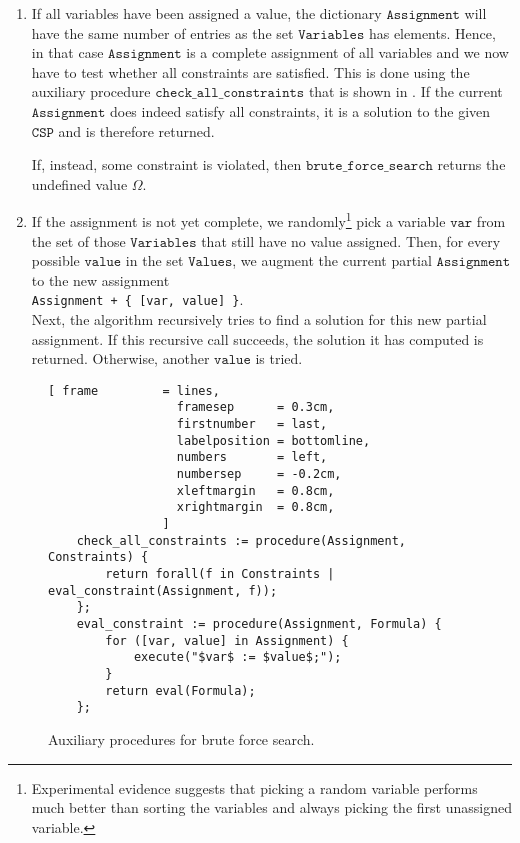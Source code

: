 \begin{enumerate}
\item If all variables have been assigned a value, the dictionary $\texttt{Assignment}$ will have the same
      number of entries as the set $\texttt{Variables}$ has elements.  Hence, in that case
      $\texttt{Assignment}$ is a complete assignment of all variables and we now have to test whether
      all constraints are satisfied.  This is done using the auxiliary procedure
      $\texttt{check\_all\_constraints}$ that is shown in . 
      If the current $\texttt{Assignment}$ does indeed satisfy all constraints, it is a solution to the given
      $\texttt{CSP}$ and is therefore returned.

      If, instead, some constraint is violated, then $\texttt{brute\_force\_search}$ returns the undefined value $\Omega$.
\item If the assignment is not yet complete, we randomly\footnote{
         Experimental evidence suggests that picking a random variable performs much better than sorting the
         variables and always picking the first unassigned variable.
      } 
      pick a variable $\texttt{var}$ from the set of those $\texttt{Variables}$ that still have no value assigned.  
      Then, for every possible
      $\texttt{value}$ in the set $\texttt{Values}$, we augment the current partial
      $\texttt{Assignment}$ to the new assignment
      \\[0.2cm]
      \hspace*{1.3cm}
      \texttt{Assignment + \{ [var, value] \}}.
      \\[0.2cm]
      Next, the algorithm recursively tries to find a solution for this new partial assignment.
      If this recursive call succeeds, the solution it has computed is returned.  Otherwise, another
      $\texttt{value}$ is tried.
\end{enumerate}


\begin{figure}[!ht]
\centering
\begin{Verbatim}[ frame         = lines, 
                  framesep      = 0.3cm, 
                  firstnumber   = last,
                  labelposition = bottomline,
                  numbers       = left,
                  numbersep     = -0.2cm,
                  xleftmargin   = 0.8cm,
                  xrightmargin  = 0.8cm,
                ]
    check_all_constraints := procedure(Assignment, Constraints) {
        return forall(f in Constraints | eval_constraint(Assignment, f));
    };       
    eval_constraint := procedure(Assignment, Formula) {
        for ([var, value] in Assignment) {
            execute("$var$ := $value$;");
        }
        return eval(Formula);
    };
\end{Verbatim}
\vspace*{-0.3cm}
\caption{Auxiliary procedures for brute force search.}
\label{fig:csp-brute-force.stlx-2}
\end{figure}

